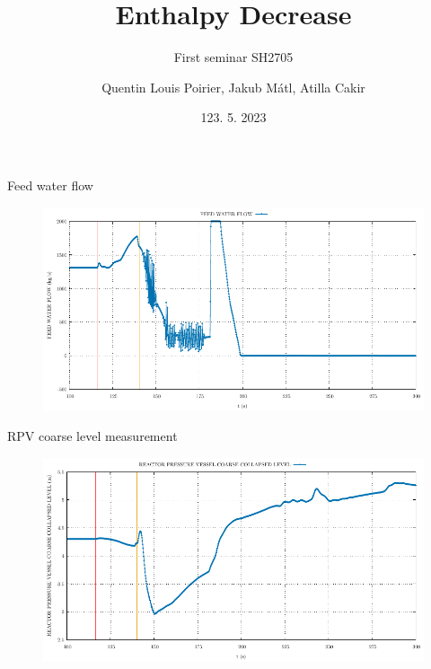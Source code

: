 

\title[APROS simulations of BWR transients]{Enthalpy Decrease}
\subtitle{First seminar SH2705}
\author{Quentin Louis Poirier, Jakub Mátl, Atilla Cakir}
\date[24/05/23]{123. 5. 2023}
\usepackage{comment}

\usepackage[style=authoryear-ibid,backend=biber]{biblatex}
\usepackage{pgfplots}
\pgfplotsset{compat=1.18}



\nologo %




\frame{\titlepage}

\begin{frame}{Feed water flow}
	\begin{figure}
		\centering
		\includegraphics[width=\textwidth]{./graphs/FEED WATER FLOW_comp.pdf}
		
	\end{figure}
	
\end{frame}
\begin{frame}{RPV coarse level measurement}
	\begin{figure}
		\centering
		\includegraphics[width=\textwidth]{./graphs/REACTOR PRESSURE VESSEL COARSE COLLAPSED LEVEL_comp.pdf}
		
	\end{figure}
	
\end{frame}

